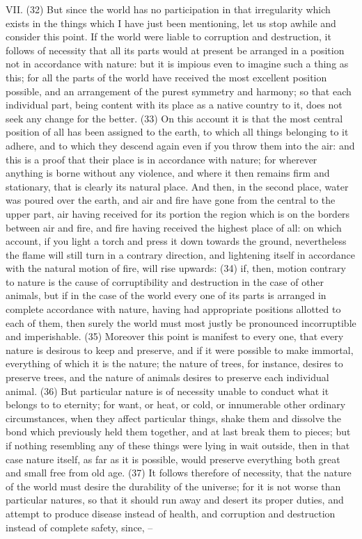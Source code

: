 VII. (32) But since the world has no participation in that irregularity which exists in the things which I
have just been mentioning, let us stop awhile and consider this point. If the world were liable to
corruption and destruction, it follows of necessity that all its parts would at present be arranged in a
position not in accordance with nature: but it is impious even to imagine such a thing as this; for all
the parts of the world have received the most excellent position possible, and an arrangement of
the purest symmetry and harmony; so that each individual part, being content with its place as a
native country to it, does not seek any change for the better. (33) On this account it is that the
most central position of all has been assigned to the earth, to which all things belonging to it
adhere, and to which they descend again even if you throw them into the air: and this is a proof that
their place is in accordance with nature; for wherever anything is borne without any violence, and
where it then remains firm and stationary, that is clearly its natural place. And then, in the second
place, water was poured over the earth, and air and fire have gone from the central to the upper
part, air having received for its portion the region which is on the borders between air and fire, and
fire having received the highest place of all: on which account, if you light a torch and press it down
towards the ground, nevertheless the flame will still turn in a contrary direction, and lightening itself
in accordance with the natural motion of fire, will rise upwards: (34) if, then, motion contrary to
nature is the cause of corruptibility and destruction in the case of other animals, but if in the case
of the world every one of its parts is arranged in complete accordance with nature, having had
appropriate positions allotted to each of them, then surely the world must most justly be
pronounced incorruptible and imperishable. (35) Moreover this point is manifest to every one, that
every nature is desirous to keep and preserve, and if it were possible to make immortal, everything
of which it is the nature; the nature of trees, for instance, desires to preserve trees, and the nature
of animals desires to preserve each individual animal. (36) But particular nature is of necessity
unable to conduct what it belongs to to eternity; for want, or heat, or cold, or innumerable other
ordinary circumstances, when they affect particular things, shake them and dissolve the bond
which previously held them together, and at last break them to pieces; but if nothing resembling any
of these things were lying in wait outside, then in that case nature itself, as far as it is possible,
would preserve everything both great and small free from old age. (37) It follows therefore of
necessity, that the nature of the world must desire the durability of the universe; for it is not worse
than particular natures, so that it should run away and desert its proper duties, and attempt to
produce disease instead of health, and corruption and destruction instead of complete safety,
since, --

